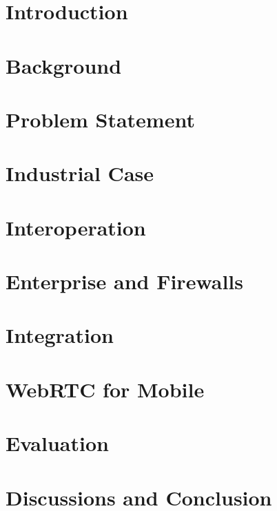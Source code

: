 \chapter{Introduction}


\chapter{Background}


%

\chapter{Problem Statement}


\chapter{Industrial Case}


\chapter{Interoperation}


\chapter{Enterprise and Firewalls}


\chapter{Integration}


\chapter{WebRTC for Mobile}


\chapter{Evaluation}


\chapter{Discussions and Conclusion}
